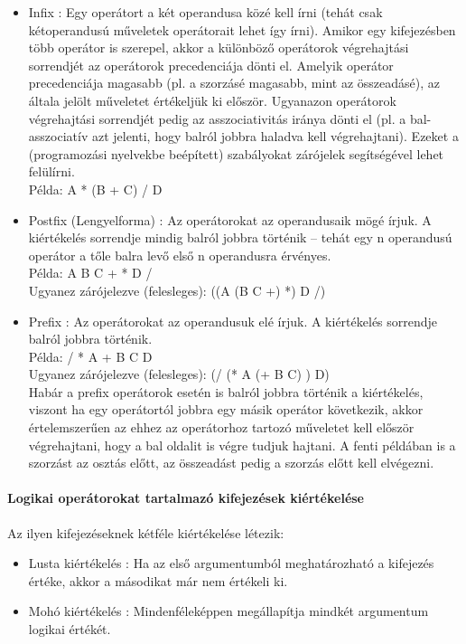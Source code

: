 \documentclass[12pt,margin=0px]{article}
\begin{document}
	\begin{itemize}
		\item	Infix : Egy operátort a két operandusa közé kell írni (tehát csak kétoperandusú műveletek operátorait
		lehet így írni).
		Amikor egy kifejezésben több operátor is szerepel, akkor a különböző operátorok végrehajtási
		sorrendjét az operátorok precedenciája dönti el. Amelyik operátor precedenciája magasabb (pl. a
		szorzásé magasabb, mint az összeadásé), az általa jelölt műveletet értékeljük ki először. Ugyanazon
		operátorok végrehajtási sorrendjét pedig az asszociativitás iránya dönti el (pl. a bal-asszociatív azt
		jelenti, hogy balról jobbra haladva kell végrehajtani). Ezeket a (programozási nyelvekbe beépített)
		szabályokat zárójelek segítségével lehet felülírni.\\
		Példa: A * (B + C) / D
		
		\item	Postfix (Lengyelforma) : Az operátorokat az operandusaik mögé írjuk. A kiértékelés sorrendje mindig balról jobbra
		történik – tehát egy n operandusú operátor a tőle balra levő első n operandusra érvényes.\\
		Példa: A B C + * D /\\
		Ugyanez zárójelezve (felesleges): ((A (B C +) *) D /)
		
		\item	Prefix : Az operátorokat az operandusuk elé írjuk. A kiértékelés sorrendje balról
		jobbra történik.\\
		Példa: / * A + B C D\\
		Ugyanez zárójelezve (felesleges): (/ (* A (+ B C) ) D)\\
		Habár a prefix operátorok esetén is balról jobbra történik a kiértékelés, viszont ha egy operátortól
		jobbra egy másik operátor következik, akkor értelemszerűen az ehhez az operátorhoz tartozó
		műveletet kell először végrehajtani, hogy a bal oldalit is végre tudjuk hajtani. A fenti példában is a
		szorzást az osztás előtt, az összeadást pedig a szorzás előtt kell elvégezni.
	\end{itemize}
	
	\paragraph{Logikai operátorokat tartalmazó kifejezések kiértékelése}

	\noindent Az ilyen kifejezéseknek kétféle kiértékelése létezik:
	\begin{itemize}
		\item	Lusta kiértékelés : Ha az első argumentumból meghatározható a kifejezés értéke, akkor a másodikat
		már nem értékeli ki.
		\item	Mohó kiértékelés : Mindenféleképpen megállapítja mindkét argumentum logikai értékét.
	\end{itemize}	
\end{document}
